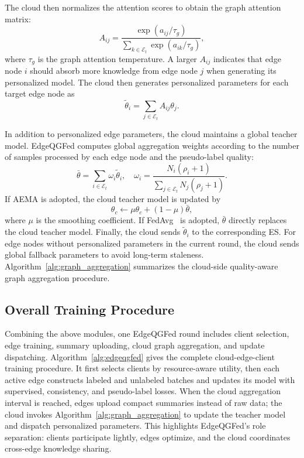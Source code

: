 ﻿\documentclass[10pt, conference, letterpaper]{ IEEEtran}
\begin{document}
The cloud then normalizes the attention scores to obtain the graph attention matrix:
\begin{equation}
    A_{ij} =
    \frac{\exp(a_{ij}/\tau_g)}
    {\sum_{k\in\mathcal{E}_t}\exp(a_{ik}/\tau_g)},
    \label{eq:attention_matrix}
\end{equation}
where $\tau_g$ is the graph attention temperature. A larger $A_{ij}$ indicates that edge node $i$ should absorb more knowledge from edge node $j$ when generating its personalized model. The cloud then generates personalized parameters for each target edge node as
\begin{equation}
    \tilde{\theta}_i =
    \sum_{j\in\mathcal{E}_t} A_{ij}\theta_j.
    \label{eq:personalized_param}
\end{equation}

In addition to personalized edge parameters, the cloud maintains a global teacher model. EdgeQGFed computes global aggregation weights according to the number of samples processed by each edge node and the pseudo-label quality:
\begin{equation}
    \bar{\theta} =
    \sum_{i\in\mathcal{E}_t}
    \omega_i \tilde{\theta}_i,
    \quad
    \omega_i =
    \frac{N_i(\rho_i+1)}
    {\sum_{j\in\mathcal{E}_t} N_j(\rho_j+1)}.
    \label{eq:global_param}
\end{equation}
If AEMA is adopted, the cloud teacher model is updated by
\begin{equation}
    \theta_c \leftarrow
    \mu \theta_c + (1-\mu)\bar{\theta},
    \label{eq:ema}
\end{equation}
where $\mu$ is the smoothing coefficient. If FedAvg~\cite{mcmahan2017communication} is adopted, $\bar{\theta}$ directly replaces the cloud teacher model. Finally, the cloud sends $\tilde{\theta}_i$ to the corresponding ES. For edge nodes without personalized parameters in the current round, the cloud sends global fallback parameters to avoid long-term staleness. Algorithm~\ref{alg:graph_aggregation} summarizes the cloud-side quality-aware graph aggregation procedure.

\subsection{Overall Training Procedure}
\label{subsec:procedure}
Combining the above modules, one EdgeQGFed round includes client selection, edge training, summary uploading, cloud graph aggregation, and update dispatching. Algorithm~\ref{alg:edgeqgfed} gives the complete cloud-edge-client training procedure. It first selects clients by resource-aware utility, then each active edge constructs labeled and unlabeled batches and updates its model with supervised, consistency, and pseudo-label losses. When the cloud aggregation interval is reached, edges upload compact summaries instead of raw data; the cloud invokes Algorithm~\ref{alg:graph_aggregation} to update the teacher model and dispatch personalized parameters. This highlights EdgeQGFed’s role separation: clients participate lightly, edges optimize, and the cloud coordinates cross-edge knowledge sharing.
\end{document}
